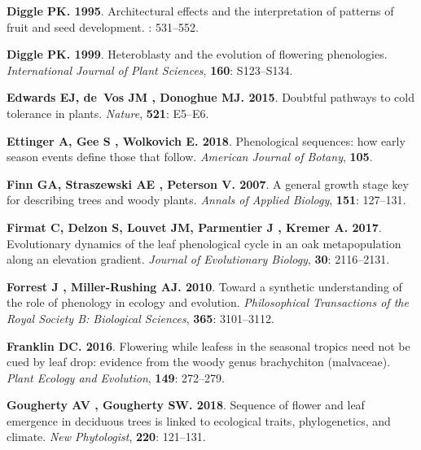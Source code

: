 \documentclass[11pt]{article}
\begin{document}
\begin{thebibliography}{48}
{\bf Diggle PK}{\bf . 1995}.
\newblock Architectural effects and the interpretation of patterns of fruit and
  seed development.
: 531--552.

{\bf Diggle PK}{\bf . 1999}.
\newblock Heteroblasty and the evolution of flowering phenologies.
\newblock \emph{International Journal of Plant Sciences}, {\bf 160}:
  S123--S134.

{\bf Edwards EJ, de~Vos JM , Donoghue MJ}{\bf . 2015}.
\newblock Doubtful pathways to cold tolerance in plants.
\newblock \emph{Nature}, {\bf 521}: E5--E6.

{\bf Ettinger A, Gee S , Wolkovich E}{\bf . 2018}.
\newblock Phenological sequences: how early season events define those that
  follow.
\newblock \emph{American Journal of Botany}, {\bf 105}.

{\bf Finn GA, Straszewski AE , Peterson V}{\bf . 2007}.
\newblock A general growth stage key for describing trees and woody plants.
\newblock \emph{Annals of Applied Biology}, {\bf 151}: 127--131.

{\bf Firmat C, Delzon S, Louvet JM, Parmentier J , Kremer A}{\bf . 2017}.
\newblock Evolutionary dynamics of the leaf phenological cycle in an oak
  metapopulation along an elevation gradient.
\newblock \emph{Journal of Evolutionary Biology}, {\bf 30}: 2116--2131.

{\bf Forrest J , Miller-Rushing AJ}{\bf . 2010}.
\newblock Toward a synthetic understanding of the role of phenology in ecology
  and evolution.
\newblock \emph{Philosophical Transactions of the Royal Society B: Biological
  Sciences}, {\bf 365}: 3101--3112.

{\bf Franklin DC}{\bf . 2016}.
\newblock Flowering while leafess in the seasonal tropics need not be cued by
  leaf drop: evidence from the woody genus brachychiton (malvaceae).
\newblock \emph{Plant Ecology and Evolution}, {\bf 149}: 272--279.

{\bf Gougherty AV , Gougherty SW}{\bf . 2018}.
\newblock Sequence of flower and leaf emergence in deciduous trees is linked to
  ecological traits, phylogenetics, and climate.
\newblock \emph{New Phytologist}, {\bf 220}: 121--131.


\end{thebibliography}
\end{document}
